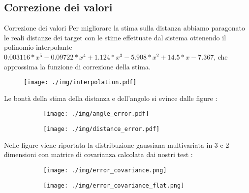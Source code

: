 \documentclass[aspectratio=169, leqno]{beamer}
\begin{document}
	\subsection{Correzione dei valori}\label{subsec:Correzione-dei-valori}
	\begin{frame}[allowframebreaks]{Correzione dei valori}
		Per migliorare la stima sulla distanza abbiamo paragonato le reali
		distanze dei target con le stime effettuate dal sistema ottenendo il
		polinomio interpolante $0.003116*x^5 - 0.09722*x^4 + 1.124*x^3
		-5.908*x^2 + 14.5*x-7.367$, che approssima la funzione di correzione della stima. 
		
		\begin{figure}[H]
			\centering
			\texttt{[image: ./img/interpolation.pdf]}
			\label{fig:interpolation}
		\end{figure}

	\framebreak
	
	Le bontà della stima della distanza e dell'angolo si evince dalle figure :

	\begin{figure}[ht]
		\begin{subfigure}{.49\textwidth}
			\centering
			\texttt{[image: ./img/angle\_error.pdf]}  
			\label{fig:angle_plot}
		\end{subfigure}
		\begin{subfigure}{.49\textwidth}
			\centering
			\texttt{[image: ./img/distance\_error.pdf]}  
			\label{fig:distance_plot}
		\end{subfigure}
		\label{fig:boxes_plot}
	\end{figure}

	\framebreak

	Nelle figure viene riportata la distribuzione gaussiana multivariata
	in 3 e 2 dimensioni con matrice di covarianza calcolata dai nostri test :
	\begin{figure}[H]
		\begin{subfigure}{0.49\linewidth}
			\centering
			\texttt{[image: ./img/error\_covariance.png]}
			\label{fig:error_covariance}
		\end{subfigure}
		\begin{subfigure}{0.49\linewidth}
			\centering
			\texttt{[image: ./img/error\_covariance\_flat.png]}
			\label{fig:error_covariance_flat}
		\end{subfigure}
	\end{figure}

	\end{frame}
\end{document}

